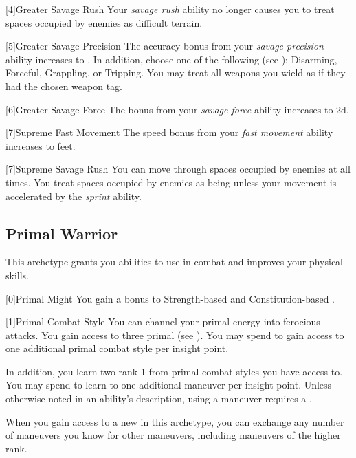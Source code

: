         [4]{Greater Savage Rush} Your \textit{savage rush} ability no longer causes you to treat spaces occupied by enemies as difficult terrain.

        [5]{Greater Savage Precision} The accuracy bonus from your \textit{savage precision} ability increases to .
        In addition, choose one of the following  (see ): Disarming, Forceful, Grappling, or Tripping.
        You may treat all weapons you wield as if they had the chosen weapon tag.

        [6]{Greater Savage Force} The bonus from your \textit{savage force} ability increases to \plus2d.

        [7]{Supreme Fast Movement} The speed bonus from your \textit{fast movement} ability increases to  feet.

        [7]{Supreme Savage Rush} You can move through spaces occupied by enemies at all times.
        You treat spaces occupied by enemies as being  unless your movement is accelerated by the \textit{sprint} ability.

    \newpage
    \subsection{Primal Warrior}
        This archetype grants you abilities to use in combat and improves your physical skills.

        [0]{Primal Might} You gain a  bonus to Strength-based  and Constitution-based .

        {
            [1]{Primal Combat Style}
            You can channel your primal energy into ferocious attacks.
            You gain access to three primal  (see ).
            You may spend  to gain access to one additional primal combat style per insight point.

            In addition, you learn two rank 1  from primal combat styles you have access to.
            You may spend  to learn to one additional maneuver per insight point.
            Unless otherwise noted in an ability's description, using a maneuver requires a .

            When you gain access to a new  in this archetype,
                you can exchange any number of maneuvers you know for other maneuvers,
                including maneuvers of the higher rank.
        }

